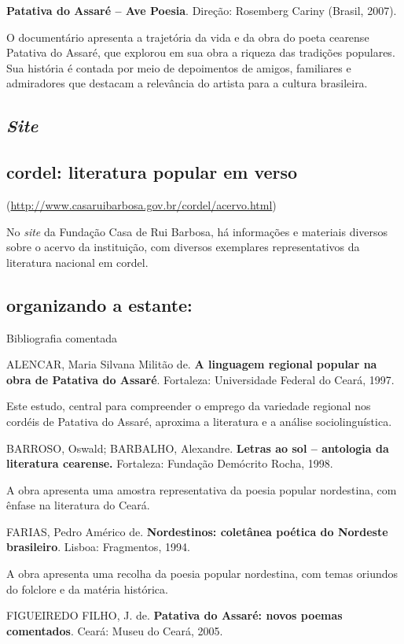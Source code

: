 \documentclass[12pt]{extarticle}
\begin{document}
  \textbf{Patativa do Assaré -- Ave Poesia}. Direção: Rosemberg Cariny
  (Brasil, 2007).

O documentário apresenta a trajetória da vida e da obra do poeta
cearense Patativa do Assaré, que explorou em sua obra a riqueza das
tradições populares. Sua história é contada por meio de depoimentos de
amigos, familiares e admiradores que destacam a relevância do artista
para a cultura brasileira.


  \subsection{\emph{Site}}


\subsection{cordel: literatura popular em verso }

(\url{http://www.casaruibarbosa.gov.br/cordel/acervo.html})

No \emph{site} da Fundação Casa de Rui Barbosa, há informações e
materiais diversos sobre o acervo da instituição, com diversos
exemplares representativos da literatura nacional em cordel.

\subsection{organizando a estante:} Bibliografia comentada


  ALENCAR, Maria Silvana Militão de. \textbf{A linguagem regional
  popular na obra de Patativa do Assaré}. Fortaleza: Universidade
  Federal do Ceará, 1997.

Este estudo, central para compreender o emprego da variedade regional
nos cordéis de Patativa do Assaré, aproxima a literatura e a análise
sociolinguística.


  BARROSO, Oswald; BARBALHO, Alexandre. \textbf{Letras ao sol --
  antologia da literatura cearense.} Fortaleza: Fundação Demócrito
  Rocha, 1998.

A obra apresenta uma amostra representativa da poesia popular
nordestina, com ênfase na literatura do Ceará.


  FARIAS, Pedro Américo de. \textbf{Nordestinos: coletânea poética do
  Nordeste brasileiro}. Lisboa: Fragmentos, 1994.

A obra apresenta uma recolha da poesia popular nordestina, com temas
oriundos do folclore e da matéria histórica.


  FIGUEIREDO FILHO, J. de. \textbf{Patativa do Assaré: novos poemas
  comentados}. Ceará: Museu do Ceará, 2005.
\end{document}

